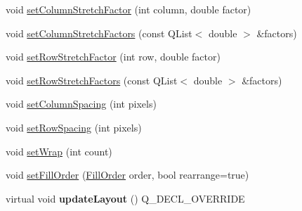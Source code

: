 \begin{DoxyCompactItemize}
\item 
void \hyperlink{classQCPLayoutGrid_ae38f31a71687b9d7ee3104852528fb50}{set\+Column\+Stretch\+Factor} (int column, double factor)
\item 
void \hyperlink{classQCPLayoutGrid_a6c2591d1a7e2534ce036989543b49e57}{set\+Column\+Stretch\+Factors} (const Q\+List$<$ double $>$ \&factors)
\item 
void \hyperlink{classQCPLayoutGrid_a7b0273de5369bd93d942edbaf5b166ec}{set\+Row\+Stretch\+Factor} (int row, double factor)
\item 
void \hyperlink{classQCPLayoutGrid_a200b45f9c908f96ebadaa3c8d87a2782}{set\+Row\+Stretch\+Factors} (const Q\+List$<$ double $>$ \&factors)
\item 
void \hyperlink{classQCPLayoutGrid_a3a49272aba32bb0fddc3bb2a45a3dba0}{set\+Column\+Spacing} (int pixels)
\item 
void \hyperlink{classQCPLayoutGrid_aaef2cd2d456197ee06a208793678e436}{set\+Row\+Spacing} (int pixels)
\item 
void \hyperlink{classQCPLayoutGrid_ab36af18d77e4428386d02970382ee598}{set\+Wrap} (int count)
\item 
void \hyperlink{classQCPLayoutGrid_affc2f3cfd22f28698c5b29b960d2a391}{set\+Fill\+Order} (\hyperlink{classQCPLayoutGrid_a7d49ee08773de6b2fd246edfed353cca}{Fill\+Order} order, bool rearrange=true)
\item 
virtual void {\bfseries update\+Layout} () Q\+\_\+\+D\+E\+C\+L\+\_\+\+O\+V\+E\+R\+R\+I\+DE\hypertarget{classQCPLayoutGrid_a6cf43f14d3fa335fd8758561ccf1f78c}{}\label{classQCPLayoutGrid_a6cf43f14d3fa335fd8758561ccf1f78c}


\end{DoxyCompactItemize}
